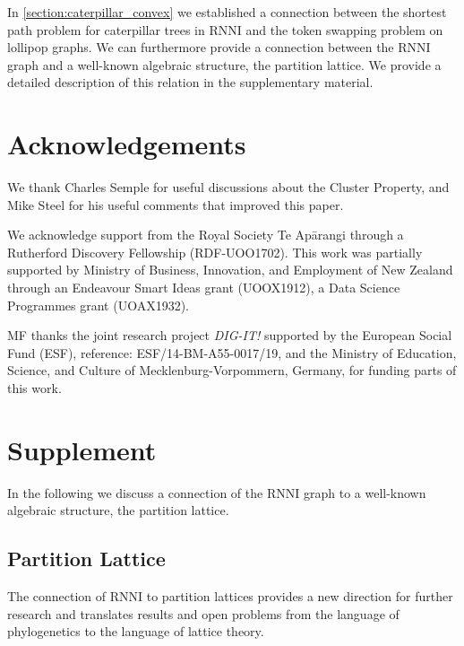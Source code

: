 \documentclass[11pt]{amsart}
\newcommand{\rnni}{\mathrm{RNNI}}
\newcommand{\summary}[1]{} %
\begin{document}
\summary{partition lattice -- can be found in supplement}
In \autoref{section:caterpillar_convex} we established a connection between the shortest path problem for caterpillar trees in $\rnni$ and the token swapping problem on lollipop graphs.
We can furthermore provide a connection between the $\rnni$ graph and a well-known algebraic structure, the partition lattice.
We provide a detailed description of this relation in the supplementary material.


\section*{Acknowledgements}
We thank Charles Semple for useful discussions about the Cluster Property, and Mike Steel for his useful comments that improved this paper.

We acknowledge support from the Royal Society Te Ap\=arangi through a Rutherford Discovery Fellowship (RDF-UOO1702).
This work was partially supported by Ministry of Business, Innovation, and Employment of New Zealand through an Endeavour Smart Ideas grant (UOOX1912), a Data Science Programmes grant (UOAX1932).

MF thanks the joint research project \textit{DIG-IT!} supported by the European Social Fund (ESF), reference: ESF/14-BM-A55-0017/19, and the Ministry of Education, Science, and Culture of Mecklenburg-Vorpommern, Germany, for funding parts of this work.


\printbibliography


\section{Supplement}

In the following we discuss a connection of the $\rnni$ graph to a well-known algebraic structure, the partition lattice.

\subsection{Partition Lattice}
The connection of $\rnni$ to partition lattices provides a new direction for further research and translates results and open problems from the language of phylogenetics to the language of lattice theory.
\end{document}
